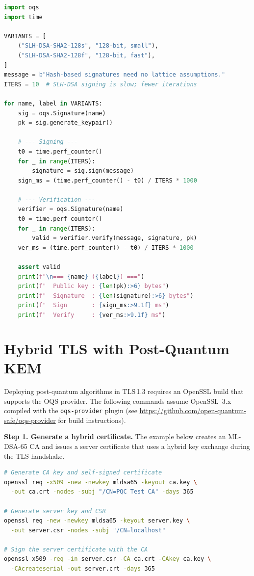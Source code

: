 \begin{lstlisting}[language=Python,caption={SLH-DSA: small vs.\ fast parameter comparison}]
import oqs
import time

VARIANTS = [
    ("SLH-DSA-SHA2-128s", "128-bit, small"),
    ("SLH-DSA-SHA2-128f", "128-bit, fast"),
]
message = b"Hash-based signatures need no lattice assumptions."
ITERS = 10  # SLH-DSA signing is slow; fewer iterations

for name, label in VARIANTS:
    sig = oqs.Signature(name)
    pk = sig.generate_keypair()

    # --- Signing ---
    t0 = time.perf_counter()
    for _ in range(ITERS):
        signature = sig.sign(message)
    sign_ms = (time.perf_counter() - t0) / ITERS * 1000

    # --- Verification ---
    verifier = oqs.Signature(name)
    t0 = time.perf_counter()
    for _ in range(ITERS):
        valid = verifier.verify(message, signature, pk)
    ver_ms = (time.perf_counter() - t0) / ITERS * 1000

    assert valid
    print(f"\n=== {name} ({label}) ===")
    print(f"  Public key : {len(pk):>6} bytes")
    print(f"  Signature  : {len(signature):>6} bytes")
    print(f"  Sign       : {sign_ms:>9.1f} ms")
    print(f"  Verify     : {ver_ms:>9.1f} ms")
\end{lstlisting}

\section{Hybrid TLS with Post-Quantum KEM}
\label{app:hybrid-tls}

Deploying post-quantum algorithms in TLS\,1.3 requires an OpenSSL build
that supports the OQS provider. The following commands assume OpenSSL~3.x
compiled with the \texttt{oqs-provider} plugin (see
\url{https://github.com/open-quantum-safe/oqs-provider} for build
instructions).

\medskip
\noindent\textbf{Step 1. Generate a hybrid certificate.}
The example below creates an ML-DSA-65 CA and issues a server certificate
that uses a hybrid key exchange during the TLS handshake.

\begin{lstlisting}[language=bash,caption={Generate an ML-DSA-65 CA and server certificate}]
# Generate CA key and self-signed certificate
openssl req -x509 -new -newkey mldsa65 -keyout ca.key \
  -out ca.crt -nodes -subj "/CN=PQC Test CA" -days 365

# Generate server key and CSR
openssl req -new -newkey mldsa65 -keyout server.key \
  -out server.csr -nodes -subj "/CN=localhost"

# Sign the server certificate with the CA
openssl x509 -req -in server.csr -CA ca.crt -CAkey ca.key \
  -CAcreateserial -out server.crt -days 365
\end{lstlisting}

